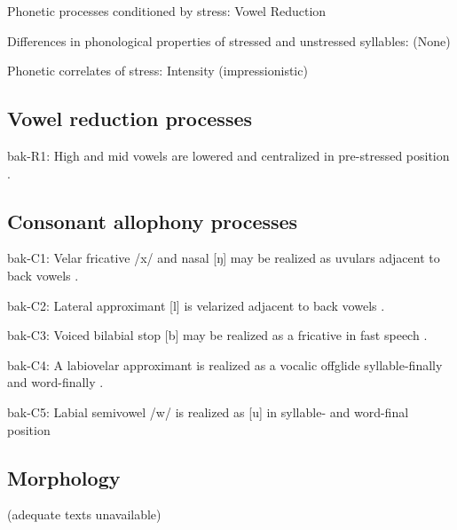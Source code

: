 {\begin{appendixdesc}
\item[Phonetic processes conditioned by stress:] Vowel Reduction

\item[Differences in phonological properties of stressed and unstressed syllables:] (None)

\item[Phonetic correlates of stress:] Intensity (impressionistic)
\end{appendixdesc}
\subsection*{Vowel reduction processes}
\begin{appendixdesc}

\item[bak-R1:] High and mid vowels are lowered and centralized in pre-stressed position \citep{BerksonEtAl2016}.
\end{appendixdesc}
\subsection*{Consonant allophony processes}
\begin{appendixdesc}

\item[bak-C1:] Velar fricative /x/ and nasal [ŋ] may be realized as uvulars adjacent to back vowels \citep[11]{Poppe1964}.

\item[bak-C2:] Lateral approximant [l] is velarized adjacent to back vowels \citep[10]{Poppe1964}.

\item[bak-C3:] Voiced bilabial stop [b] may be realized as a fricative in fast speech \citep[8]{Poppe1964}.

\item[bak-C4:]  A labiovelar approximant is realized as a vocalic offglide syllable-finally and word-finally \citep[9]{Poppe1964}.

\item[bak-C5:] Labial semivowel /w/ is realized as [u] in syllable- and word-final position \citep[9]{Poppe1964}
\end{appendixdesc}

\subsection*{Morphology}

(adequate texts unavailable)

}
